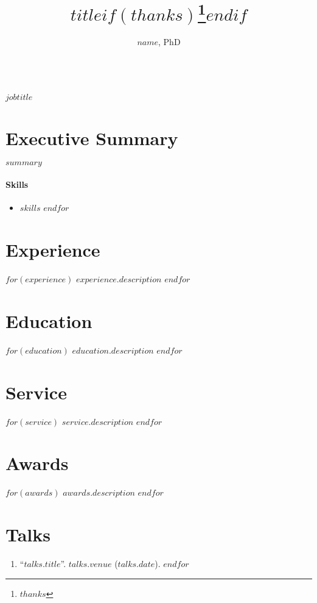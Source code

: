 \documentclass[11pt]{article}
\title{$title$$if(thanks)$\thanks{$thanks$}$endif$}
\author{$name$, PhD}
\date{}
\makeatletter
\renewcommand\maketitle{
    {\noindent\Large\sffamily\bfseries \@author\\
		\large\normalfont\itshape $jobtitle$}
  }
\makeatother
\begin{document}
\maketitle
\thispagestyle{empty}

\section{Executive Summary}
\noindent $summary$
\paragraph{Skills} \begin{multicols}{3}
	\begin{itemize}
		$for(skills)$
		\item $skills$
		$endfor$
	\end{itemize}
\end{multicols}
\titlerule

\section*{Experience}
$for(experience)$
$experience.description$
$endfor$

\section*{Education}
$for(education)$
$education.description$
$endfor$

\section*{Service}
$for(service)$
$service.description$
$endfor$

\section*{Awards}
$for(awards)$
$awards.description$
$endfor$

\section*{Talks}
\begin{enumerate}
$for(talks)$
\item ``\href{$talks.link$}{$talks.title$}''. $talks.venue$ ($talks.date$).
$endfor$
\end{enumerate}
\end{document}
